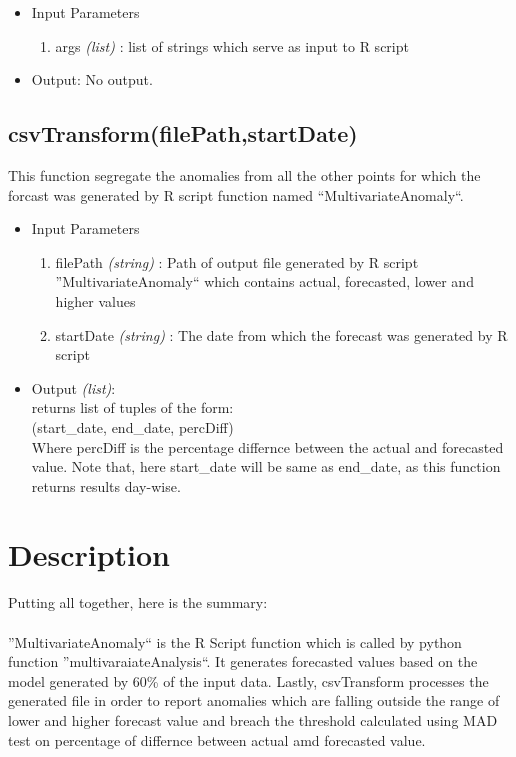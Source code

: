 \begin{itemize}
 \item Input Parameters
 
 \begin{enumerate}
  \item args \textit{(list)} : list of strings which serve as input to R script 

 \end{enumerate}

 \item Output: No output.

\end{itemize}

\subsection{csvTransform(filePath,startDate)}

This function segregate the anomalies from all the other points for which the forcast was 
generated by R script function named ``MultivariateAnomaly``.

\begin{itemize}
 \item Input Parameters
 
 \begin{enumerate}
  \item filePath \textit{(string)} : Path of output file generated by R script ''MultivariateAnomaly`` which contains actual, forecasted, lower and higher values  
  \item startDate \textit{(string)} : The date from which the forecast was generated by R script
 \end{enumerate}

 \item Output \textit{(list)}: \\
  returns list of tuples of the form: \\
  (start\_date, end\_date, percDiff) \\
  Where percDiff is the percentage differnce between the actual and forecasted value.
  Note that, here start\_date will be same as end\_date, as this function 
returns results day-wise.
 

\end{itemize}


\section{Description}

Putting all together, here is the summary:\\
\\
''MultivariateAnomaly`` is the R Script function which is called by  python function ''multivaraiateAnalysis``.
It generates forecasted values based on the model generated by 60\% of the input data.
Lastly, csvTransform processes the generated file in order to report anomalies which are falling outside the range of lower
and higher forecast value and breach the threshold calculated using MAD test on percentage of differnce between actual amd 
forecasted value.